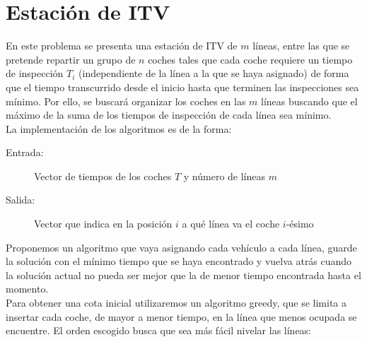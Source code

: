 \section{Estación de ITV}

En este problema se presenta una estación de ITV de $m$ líneas, entre las que
se pretende repartir un grupo de $n$ coches tales que cada coche requiere un
tiempo de inspección $T_i$ (independiente de la línea a la que se haya asignado)
de forma que el tiempo transcurrido desde el inicio hasta que terminen las
inspecciones sea mínimo. Por ello, se buscará organizar los coches en las $m$
líneas buscando que el máximo de la suma de los tiempos de inspección de cada
línea sea mínimo. \\

La implementación de los algoritmos es de la forma:
\begin{description}
\item[Entrada:] Vector de tiempos de los coches $T$ y número de líneas $m$
\item[Salida:] Vector que indica en la posición $i$ a qué línea va el coche $i$-ésimo
\end{description}

Proponemos un algoritmo que vaya asignando cada vehículo a cada línea, guarde la solución con el mínimo tiempo que se haya encontrado y vuelva atrás cuando la solución actual no pueda ser mejor que la de menor tiempo encontrada hasta el momento. \\

Para obtener una cota inicial utilizaremos un algoritmo greedy, que se limita a insertar cada coche, de mayor a menor tiempo, en la línea que menos ocupada se encuentre. El orden escogido busca que sea más fácil nivelar las líneas:




